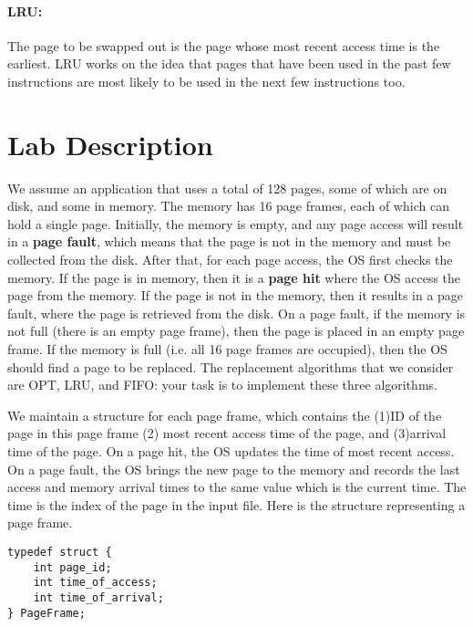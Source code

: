 \documentclass[letterpaper,10pt]{article}
\begin{document}
\paragraph{{\bf LRU}:} The page to be swapped out is the page whose most recent access time is the earliest. LRU
works on the idea that pages that have been used in the past few instructions are most likely to
be used in the next few instructions too.

\section{Lab Description}
We assume an application that uses a total of 128 pages, some of which are on disk, and some
in memory. The memory has 16 page frames, each of which can hold a single page. Initially, the
memory is empty, and any page access will result in a {\bf page fault}, which means that the page is
not in the memory and must be collected from the disk. After that, for each page access, the OS
first checks the memory. If the page is in memory, then it is a {\bf page hit} where the OS access the
page from the memory. If the page is not in the memory, then it results in a page fault, where
the page is retrieved from the disk. On a page fault, if the memory is not full (there is an empty
page frame), then the page is placed in an empty page frame. If the memory is full (i.e. all 16
page frames are occupied), then the OS should find a page to be replaced. The replacement
algorithms that we consider are OPT, LRU, and FIFO: your task is to implement these three
algorithms.

We maintain a structure for each page frame, which contains the (1)ID of the page in this page
frame (2) most recent access time of the page, and (3)arrival time of the page. On a page hit, the
OS updates the time of most recent access. On a page fault, the OS brings the new page to the
memory and records the last access and memory arrival times to the same value which is the
current time. The time is the index of the page in the input file. Here is the structure
representing a page frame.
\begin{verbatim}
typedef struct {
    int page_id;
    int time_of_access;
    int time_of_arrival;
} PageFrame;
\end{verbatim}
\end{document}
